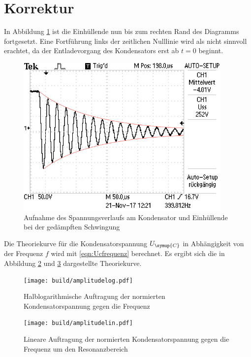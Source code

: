 \newpage
\section{Korrektur}
\label{sec:Korrektur}

In Abbildung \ref{fig:einhuellende2} ist die Einhüllende nun bis zum rechten Rand
des Diagramms fortgesetzt. Eine Fortführung links der zeitlichen Nulllinie wird
als nicht sinnvoll erachtet, da der Entladevorgang des Kondensators erst ab $t=0$
beginnt.

\begin{figure}
  \centering
  \includegraphics[width=300pt]{data/gedaempfte_schwingung2.JPG}
  \caption{Aufnahme des Spannungsverlaufs am Kondensator und Einhüllende bei der
  gedämpften Schwingung}
  \label{fig:einhuellende2}
\end{figure}

Die Theoriekurve für die Kondensatorspannung $U_{\symup{C}}$ in Abhängigkeit
von der Frequenz $f$ wird mit \eqref{eqn:Ucfrequenz} berechnet. Es ergibt sich die
in Abbildung \ref{fig:amplitudelog2} und \ref{fig:amplitudelin2} dargestellte
Theoriekurve.

\begin{figure}
  \centering
  \texttt{[image: build/amplitudelog.pdf]}
  \caption{Halblogarithmische Auftragung der normierten Kondensatorspannung
  gegen die Frequenz}
  \label{fig:amplitudelog2}
\end{figure}

\begin{figure}
  \centering
  \texttt{[image: build/amplitudelin.pdf]}
  \caption{Lineare Auftragung der normierten Kondensatorspannung gegen die
  Frequenz um den Resonanzbereich}
  \label{fig:amplitudelin2}
\end{figure}

